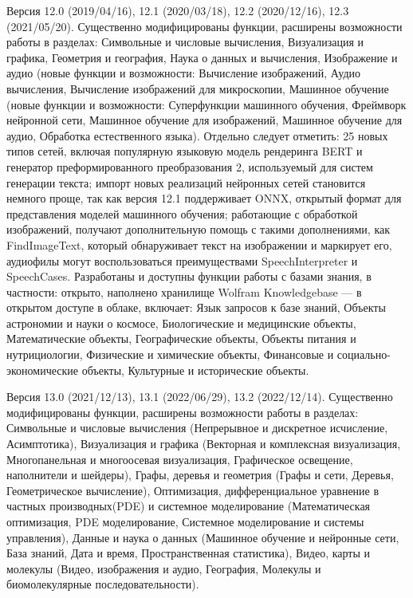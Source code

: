 \begin{textitemize}
	\item Версия 12.0 (2019/04/16), 12.1 (2020/03/18), 12.2 (2020/12/16), 12.3 (2021/05/20). Существенно модифицированы функции, расширены возможности работы в разделах: Символьные и числовые вычисления, Визуализация и графика, Геометрия и география, Наука о данных и вычисления, Изображение и аудио (новые функции и возможности: Вычисление изображений, Аудио вычисления, Вычисление изображений для микроскопии, Машинное обучение (новые функции и возможности: Суперфункции машинного обучения, Фреймворк нейронной сети, Машинное обучение для изображений, Машинное обучение для аудио, Обработка естественного языка). Отдельно следует отметить: 25 новых типов сетей, включая популярную языковую модель рендеринга BERT и генератор преформированного преобразования 2, используемый для систем генерации текста; импорт новых реализаций нейронных сетей становится немного проще, так как версия 12.1 поддерживает ONNX, открытый формат для представления моделей машинного обучения; работающие с обработкой изображений, получают дополнительную помощь с такими дополнениями, как FindImageText, который обнаруживает текст на изображении и маркирует его, аудиофилы могут воспользоваться преимуществами SpeechInterpreter и SpeechCases. Разработаны и доступны функции работы с базами знания, в частности: открыто, наполнено хранилище Wolfram Knowledgebase --- в открытом доступе в облаке, включает: Язык запросов к базе знаний, Объекты астрономии и науки о космосе, Биологические и медицинские объекты, Математические объекты, Географические объекты, Объекты питания и нутрициологии, Физические и химические объекты, Финансовые и социально-экономические объекты, Культурные и исторические объекты.
	\item Версия 13.0 (2021/12/13), 13.1 (2022/06/29), 13.2 (2022/12/14). Существенно модифицированы функции, расширены возможности работы в разделах: Символьные и числовые вычисления (Непрерывное и дискретное исчисление, Асимптотика), Визуализация и графика (Векторная и комплексная визуализация, Многопанельная и многоосевая визуализация, Графическое освещение, наполнители и шейдеры), Графы, деревья и геометрия (Графы и сети, Деревья, Геометрическое вычисление), Оптимизация, дифференциальное уравнение в частных производных(PDE) и системное моделирование (Математическая оптимизация, PDE моделирование, Системное моделирование и системы управления), Данные и наука о данных (Машинное обучение и нейронные сети, База знаний, Дата и время, Пространственная статистика), Видео, карты и молекулы (Видео, изображения и аудио, География, Молекулы и биомолекулярные последовательности). 
\end{textitemize}

